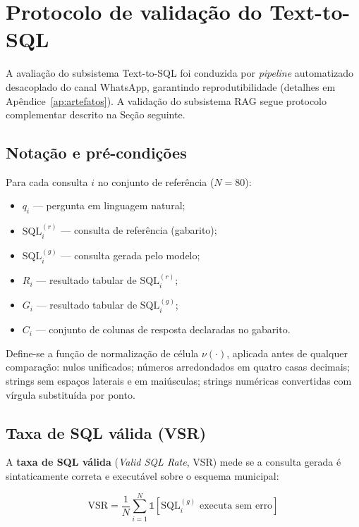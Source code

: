 \section{Protocolo de validação do Text-to-SQL}

A avaliação do subsistema Text-to-SQL foi conduzida por \textit{pipeline} automatizado desacoplado do canal WhatsApp, garantindo reprodutibilidade (detalhes em Apêndice~\ref{ap:artefatos}). A validação do subsistema RAG segue protocolo complementar descrito na Seção seguinte.



\subsection{Notação e pré-condições}

Para cada consulta $i$ no conjunto de referência ($N = 80$):

\begin{itemize}
    \item $q_i$ --- pergunta em linguagem natural;
    \item $\text{SQL}_i^{(r)}$ --- consulta de referência (gabarito);
    \item $\text{SQL}_i^{(g)}$ --- consulta gerada pelo modelo;
    \item $R_i$ --- resultado tabular de $\text{SQL}_i^{(r)}$;
    \item $G_i$ --- resultado tabular de $\text{SQL}_i^{(g)}$;
    \item $C_i$ --- conjunto de colunas de resposta declaradas no gabarito.
\end{itemize}

Define-se a função de normalização de célula $\nu(\cdot)$, aplicada antes de qualquer comparação: nulos unificados; números arredondados em quatro casas decimais; strings sem espaços laterais e em maiúsculas; strings numéricas convertidas com vírgula substituída por ponto.

\subsection{Taxa de SQL válida (VSR)}

A \textbf{taxa de SQL válida} (\textit{Valid SQL Rate}, VSR) mede se a consulta gerada é sintaticamente correta e executável sobre o esquema municipal:

\begin{equation}
\text{VSR} = \frac{1}{N} \sum_{i=1}^{N} \mathbb{1}\!\left[\text{SQL}_i^{(g)} \text{ executa sem erro}\right]
\end{equation}

